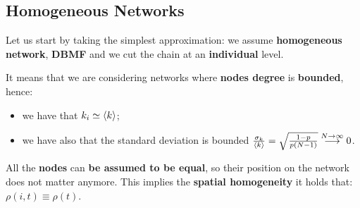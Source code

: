 \documentclass[../main/main.tex]{subfiles}
\begin{document}
\subsection{Homogeneous Networks}
Let us start by taking the simplest approximation: we assume \textbf{homogeneous network}, \textbf{DBMF} and we cut the chain at an \textbf{individual} level.

It means that we are considering networks where \textbf{nodes degree} is \textbf{bounded}, hence:
\begin{itemize}
\item we have that \( k_i \simeq \expval{k}  \);
\item we have also that the standard deviation is bounded \( \frac{\sigma _k}{\expval{k} } = \sqrt{ \frac{1-p}{p(N-1)} } \overset{N \rightarrow \infty }{\longrightarrow} 0\).
\end{itemize}
All the \textbf{nodes} can \textbf{be assumed to be equal}, so their position on the network does not matter anymore. This implies the \textbf{spatial homogeneity} it holds that: \( \rho (i,t) \equiv \rho (t) \).
\end{document}
